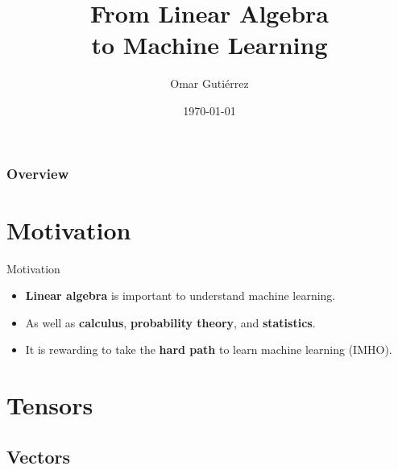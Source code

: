 \documentclass[handout]{beamer}
\title[\insertdate]{From Linear Algebra\\to Machine Learning}
\author{Omar Guti\'errez}
\institute{@trinogz}
\date{\today}
\begin{document}
\maketitle

\begin{frame}
    \frametitle{Overview}
    \tableofcontents
\end{frame}


\section{Motivation}
\begin{frame}{Motivation}
    \begin{itemize}
        \item \textbf{Linear algebra} is important to understand machine learning.
        \item As well as \textbf{calculus}, \textbf{probability theory}, and \textbf{statistics}.
        \item It is rewarding to take the \textbf{hard path} to learn machine learning (IMHO).
    \end{itemize}
\end{frame}




\section{Tensors}
\subsection{Vectors}
\end{document}
